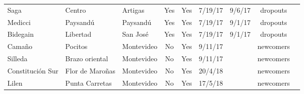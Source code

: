\documentclass[11pt]{article}
\begin{document}
\begin{small}
\begin{table}[htbp!]
\begin{tabular}{@{}lllcccccc@{}}
 Saga     &     Centro     &     Artigas     &     Yes     &     Yes     &     7/19/17     &   9/6/17     &     dropouts  \\
 Medicci     &     Paysandú     &     Paysandú     &     Yes     &     Yes     &   7/19/17     &     9/1/17     &     dropouts  \\
 Bidegain     &     Libertad     &     San José     &     Yes     &     Yes     &    7/19/17     &     9/1/17     &     dropouts  \\
 Camaño     &     Pocitos     &     Montevideo     &     No     &     Yes     &    9/11/17     &          &     newcomers  \\
 Silleda     &     Brazo oriental     &     Montevideo     &     No     &     Yes     &     9/11/17     &          &     newcomers\\
 Constitución Sur     &     Flor de Maroñas     &     Montevideo     &     No     &     Yes     &     20/4/18     &          &     newcomers  \\
 Lilen     &     Punta Carretas     &     Montevideo     &     No     &     Yes     &     17/5/18     &          &     newcomers  \\
\bottomrule
\end{tabular}
\end{table}
\end{small}
\end{document}
